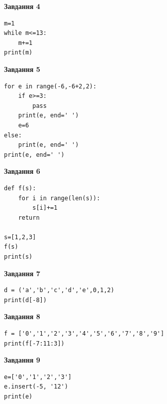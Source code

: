 \documentclass[12pt, ukrainian]{article}
\begin{document}
{{{{{{{{{{\begin{minipage}[t]{7.5cm}
\begin{center}
\textbf{Завдання 4}
\end{center}

\begin{verbatim}
m=1
while m<=13:
    m+=1
print(m)
\end{verbatim}

\end{minipage}
\vline \hspace{6mm}
\begin{minipage}[t]{10.5cm}

\begin{center}
\textbf{Завдання 5}
\end{center}

\begin{verbatim}
for e in range(-6,-6+2,2):
    if e>=3:
        pass
    print(e, end=' ')
    e=6
else:
    print(e, end=' ')
print(e, end=' ')
\end{verbatim}



\begin{center}
\textbf{Завдання 6}
\end{center}

\begin{verbatim}
def f(s):
    for i in range(len(s)):
        s[i]+=1
    return

s=[1,2,3]
f(s)
print(s)
\end{verbatim}



\begin{center}
\textbf{Завдання 7}
\end{center}

\begin{verbatim}
d = ('a','b','c','d','e',0,1,2)
print(d[-8])
\end{verbatim}



\begin{center}
\textbf{Завдання 8}
\end{center}

\begin{verbatim}
f = ['0','1','2','3','4','5','6','7','8','9']
print(f[-7:11:3])
\end{verbatim}



\begin{center}
\textbf{Завдання 9}
\end{center}

\begin{verbatim}
e=['0','1','2','3']
e.insert(-5, '12')
print(e)
\end{verbatim}




\end{minipage}}}}}}}}}}}
\end{document}
